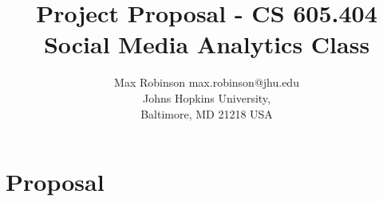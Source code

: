 \documentclass[jair,twoside,11pt,theapa]{article}
\begin{document}
\title{Project Proposal - CS 605.404 Social Media Analytics Class}


\author{\name Max Robinson \email max.robinson@jhu.edu \\
	\addr Johns Hopkins University,\\
	Baltimore, MD 21218 USA
}

\maketitle

\section{Proposal}



\vskip 0.2in

\end{document}
